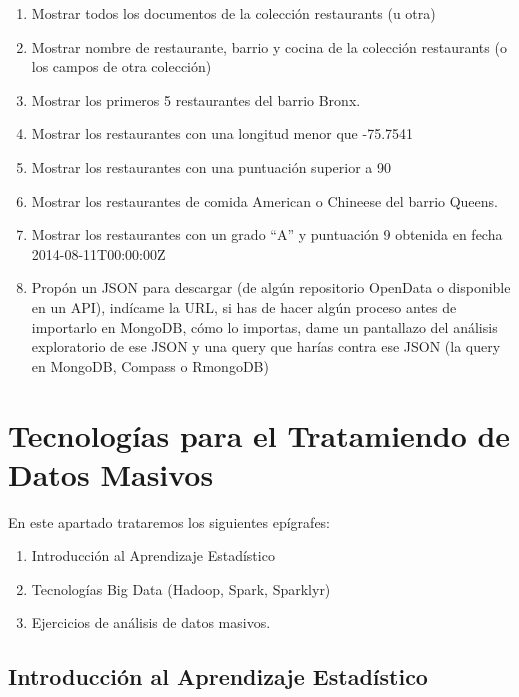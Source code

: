 \documentclass[
]{book}
\begin{document}
\begin{enumerate}
\def\labelenumi{\arabic{enumi}.}
\item
  Mostrar todos los documentos de la colección restaurants (u otra)
\item
  Mostrar nombre de restaurante, barrio y cocina de la colección restaurants (o los campos de otra colección)
\item
  Mostrar los primeros 5 restaurantes del barrio Bronx.
\item
  Mostrar los restaurantes con una longitud menor que -75.7541
\item
  Mostrar los restaurantes con una puntuación superior a 90
\item
  Mostrar los restaurantes de comida American o Chineese del barrio Queens.
\item
  Mostrar los restaurantes con un grado ``A'' y puntuación 9 obtenida en fecha 2014-08-11T00:00:00Z
\item
  Propón un JSON para descargar (de algún repositorio OpenData o disponible en un API), indícame la URL, si has de hacer algún proceso antes de importarlo en MongoDB, cómo lo importas, dame un pantallazo del análisis exploratorio de ese JSON y una query que harías contra ese JSON (la query en MongoDB, Compass o RmongoDB)
\end{enumerate}

\hypertarget{tecnologuxedas-para-el-tratamiendo-de-datos-masivos}{%
\chapter{Tecnologías para el Tratamiendo de Datos Masivos}\label{tecnologuxedas-para-el-tratamiendo-de-datos-masivos}}

En este apartado trataremos los siguientes epígrafes:

\begin{enumerate}
\def\labelenumi{\arabic{enumi}.}
\item
  Introducción al Aprendizaje Estadístico
\item
  Tecnologías Big Data (Hadoop, Spark, Sparklyr)
\item
  Ejercicios de análisis de datos masivos.
\end{enumerate}

\hypertarget{introducciuxf3n-al-aprendizaje-estaduxedstico}{%
\section{Introducción al Aprendizaje Estadístico}\label{introducciuxf3n-al-aprendizaje-estaduxedstico}}
\end{document}

